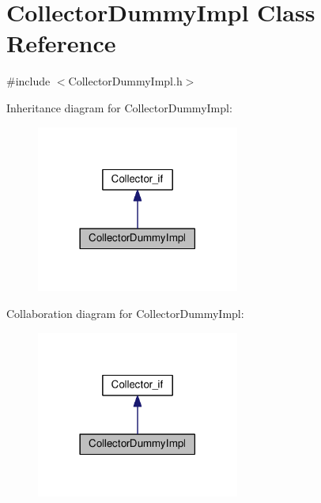 \hypertarget{class_collector_dummy_impl}{}\section{Collector\+Dummy\+Impl Class Reference}
\label{class_collector_dummy_impl}


{\ttfamily \#include $<$Collector\+Dummy\+Impl.\+h$>$}



Inheritance diagram for Collector\+Dummy\+Impl\+:\nopagebreak
\begin{figure}[H]
\begin{center}
\leavevmode
\includegraphics[width=189pt]{class_collector_dummy_impl__inherit__graph}
\end{center}
\end{figure}


Collaboration diagram for Collector\+Dummy\+Impl\+:\nopagebreak
\begin{figure}[H]
\begin{center}
\leavevmode
\includegraphics[width=189pt]{class_collector_dummy_impl__coll__graph}
\end{center}
\end{figure}
